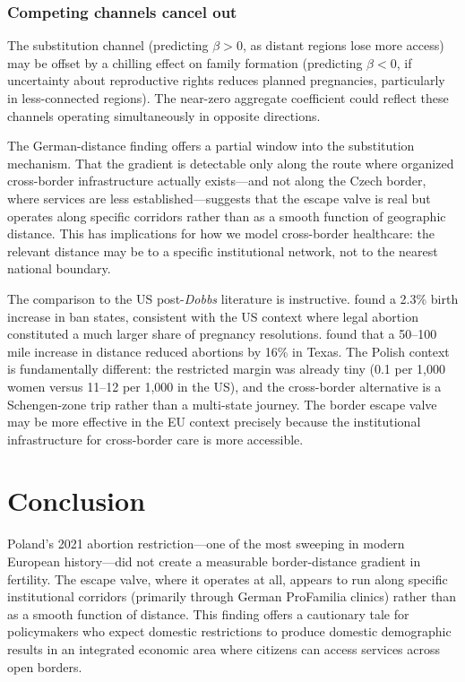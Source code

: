 \documentclass[12pt]{article}
\begin{document}
\subsubsection*{Competing channels cancel out} The substitution channel (predicting $\beta > 0$, as distant regions lose more access) may be offset by a chilling effect on family formation (predicting $\beta < 0$, if uncertainty about reproductive rights reduces planned pregnancies, particularly in less-connected regions). The near-zero aggregate coefficient could reflect these channels operating simultaneously in opposite directions.

The German-distance finding offers a partial window into the substitution mechanism. That the gradient is detectable only along the route where organized cross-border infrastructure actually exists---and not along the Czech border, where services are less established---suggests that the escape valve is real but operates along specific corridors rather than as a smooth function of geographic distance. This has implications for how we model cross-border healthcare: the relevant distance may be to a specific institutional network, not to the nearest national boundary.

The comparison to the US post-\textit{Dobbs} literature is instructive. \citet{dench2024} found a 2.3\% birth increase in ban states, consistent with the US context where legal abortion constituted a much larger share of pregnancy resolutions. \citet{lindo2020} found that a 50--100 mile increase in distance reduced abortions by 16\% in Texas. The Polish context is fundamentally different: the restricted margin was already tiny (0.1 per 1,000 women versus 11--12 per 1,000 in the US), and the cross-border alternative is a Schengen-zone trip rather than a multi-state journey. The border escape valve may be more effective in the EU context precisely because the institutional infrastructure for cross-border care is more accessible.


\section{Conclusion}

Poland's 2021 abortion restriction---one of the most sweeping in modern European history---did not create a measurable border-distance gradient in fertility. The escape valve, where it operates at all, appears to run along specific institutional corridors (primarily through German ProFamilia clinics) rather than as a smooth function of distance. This finding offers a cautionary tale for policymakers who expect domestic restrictions to produce domestic demographic results in an integrated economic area where citizens can access services across open borders.
\end{document}
